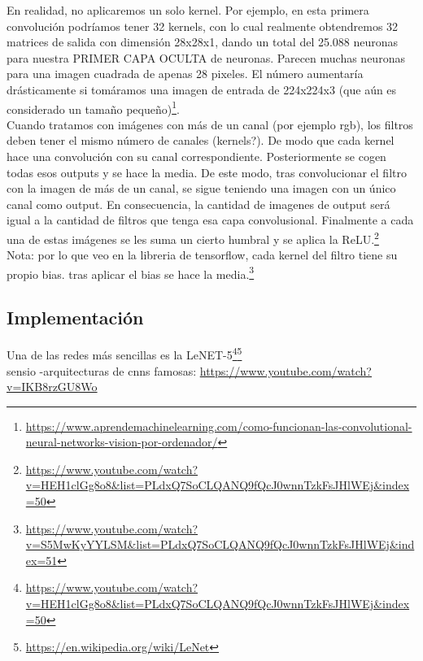 \documentclass{article}
\begin{document}
En realidad, no aplicaremos un solo kernel. Por ejemplo, en esta primera convolución podríamos tener 32 kernels, con lo cual realmente obtendremos 32 matrices de salida con dimensión 28x28x1, dando un total del 25.088 neuronas para nuestra PRIMER CAPA OCULTA de neuronas. Parecen muchas neuronas para una imagen cuadrada de apenas 28 pixeles. El número aumentaría drásticamente si tomáramos una imagen de entrada de 224x224x3 (que aún es considerado un tamaño pequeño)\footnote{\url{https://www.aprendemachinelearning.com/como-funcionan-las-convolutional-neural-networks-vision-por-ordenador/}}.\\

Cuando tratamos con imágenes con más de un canal (por ejemplo rgb), los filtros deben tener el  mismo número de canales (kernels?). De modo que cada kernel  hace una convolución con su canal correspondiente. Posteriormente se cogen todas esos outputs y se hace la media. De este modo, tras convolucionar el filtro con la imagen de más de un canal, se sigue teniendo una imagen con un único canal como output. En consecuencia, la cantidad de imagenes de output será igual a la cantidad de filtros que tenga esa capa convolusional. Finalmente a cada una de estas imágenes se les suma un cierto humbral y se aplica la ReLU.\footnote{\url{https://www.youtube.com/watch?v=HEH1clGg8o8&list=PLdxQ7SoCLQANQ9fQcJ0wnnTzkFsJHlWEj&index=50}}\\

Nota: por lo que veo en la libreria de tensorflow, cada kernel del filtro tiene su propio bias. tras aplicar el bias se hace la media.\footnote{\url{https://www.youtube.com/watch?v=S5MwKyYYLSM&list=PLdxQ7SoCLQANQ9fQcJ0wnnTzkFsJHlWEj&index=51}}

\subsection{Implementación}
Una de las redes más sencillas es la LeNET-5\footnote{\url{https://www.youtube.com/watch?v=HEH1clGg8o8&list=PLdxQ7SoCLQANQ9fQcJ0wnnTzkFsJHlWEj&index=50}}\footnote{\url{https://en.wikipedia.org/wiki/LeNet}}\\

sensio -arquitecturas de cnns famosas: \url{https://www.youtube.com/watch?v=IKB8rzGU8Wo}
\end{document}
